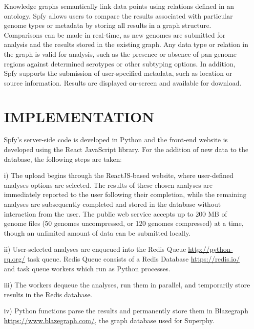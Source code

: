 \documentclass[a4,center,fleqn]{NAR}
\begin{document}

Knowledge graphs semantically link data points using relations defined in an ontology. Spfy allows users to compare the results associated with particular genome types or metadata by storing all results in a graph structure. Comparisons can be made in real-time, as new genomes are submitted for analysis and the results stored in the existing graph. Any data type or relation in the graph is valid for analysis, such as the presence or absence of pan-genome regions against determined serotypes or other subtyping options. In addition, Spfy supports the submission of user-specified metadata, such as location or source information. Results are displayed on-screen and available for download.

\section{IMPLEMENTATION}
Spfy's server-side code is developed in Python and the front-end website is developed using the React JavaScript library. For the addition of new data to the database, the following steps are taken:

i) The upload begins through the ReactJS-based website, where user-defined analyses options are selected. The results of these chosen analyses are immediately reported to the user following their completion, while the remaining analyses are subsequently completed and stored in the database without interaction from the user. The public web service accepts up to 200 MB of genome files (50 genomes uncompressed, or 120 genomes compressed) at a time, though an unlimited amount of data can be submitted locally.

ii) User-selected analyses are enqueued into the Redis Queue \url{http://python-rq.org/} task queue. Redis Queue consists of a Redis Database \url{https://redis.io/} and task queue workers which run as Python processes.

iii) The workers dequeue the analyses, run them in parallel, and temporarily store results in the Redis database.

iv) Python functions parse the results and permanently store them in Blazegraph \url{https://www.blazegraph.com/}, the graph database used for Superphy.
\end{document}
